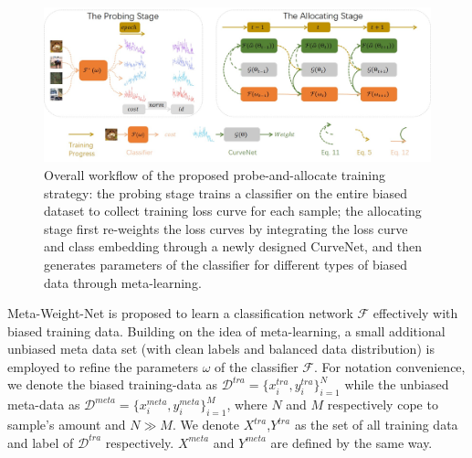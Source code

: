 \documentclass[letterpaper]{article} %
\begin{document}
\begin{figure}[t]
\begin{center}
   \includegraphics[width=0.85\linewidth]{figs/framework.jpg}
\end{center}
   \caption{Overall workflow of the proposed probe-and-allocate training strategy: the probing stage trains a classifier on the entire biased dataset to collect training loss curve for each sample; the allocating stage first re-weights the loss curves by integrating the loss curve and class embedding through a newly designed CurveNet, and then generates parameters of the classifier for different types of biased data through meta-learning.
   }
\label{fig:framework}
\end{figure}

Meta-Weight-Net is proposed to learn a classification network $\mathcal{F}$ effectively with biased training data.
Building on the idea of meta-learning, a small additional unbiased meta data set (with clean labels and balanced data distribution) is employed to refine the parameters $\omega$ of the classifier $\mathcal{F}$.
For notation convenience, we denote the biased training-data as $\mathcal{D}^{tra}=\{x^{tra}_i,y^{tra}_i\}_{i=1}^N$ while the unbiased meta-data as $\mathcal{D}^{meta}=\{x^{meta}_i,y^{meta}_i\}_{i=1}^M$,  where $N$ and $M$ respectively cope to sample's amount and $N \gg M$.
We denote $X^{tra}$,$Y^{tra}$ as the set of all training data and label of $\mathcal{D}^{tra}$ respectively.
$X^{meta}$ and $Y^{meta}$ are defined by the same way.
\end{document}
